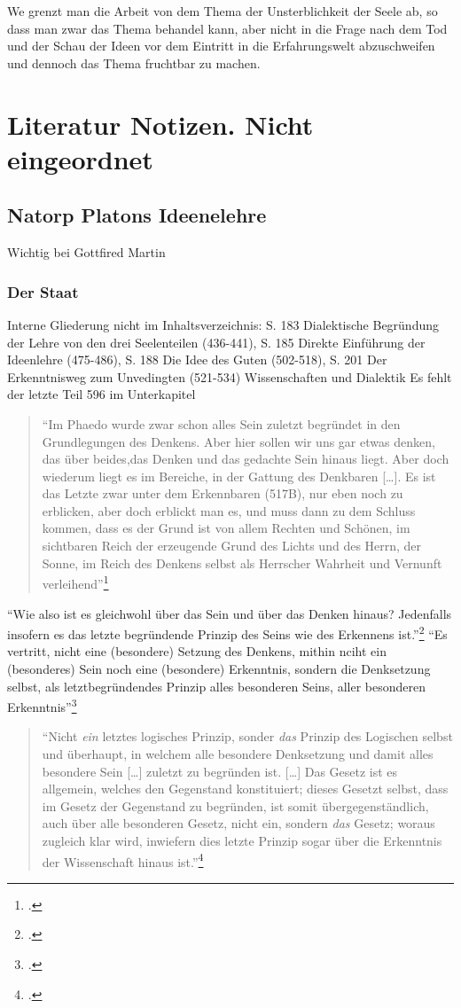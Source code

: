 \documentclass[12pt]{article}
\newcommand*{\zitatblock}[1]{%
    \begin{quote}
    \fontsize{10}{12}\selectfont
    \setlength{\parskip}{1.0em}
    #1
    \end{quote}
}
\begin{document}
We grenzt man die Arbeit von dem Thema der Unsterblichkeit der Seele ab, so dass man zwar das Thema behandel kann, aber nicht in die Frage nach dem Tod und der Schau der Ideen vor dem Eintritt in die Erfahrungswelt abzuschweifen und dennoch das Thema fruchtbar zu machen.

\section*{Literatur Notizen. Nicht eingeordnet}
\subsection*{Natorp Platons Ideenelehre}
Wichtig bei Gottfired Martin\nocite{NatorpIdeenlehre}
\subsubsection*{Der Staat}
Interne Gliederung nicht im Inhaltsverzeichnis: S. 183 Dialektische Begründung der Lehre von den drei Seelenteilen (436-441), S. 185 Direkte Einführung der Ideenlehre (475-486), S. 188 Die Idee des Guten (502-518), S. 201 Der Erkenntnisweg zum Unvedingten (521-534) Wissenschaften und Dialektik
Es fehlt der letzte Teil 596 im Unterkapitel
\zitatblock{\enquote{Im Phaedo wurde zwar schon alles Sein zuletzt begründet in den Grundlegungen des Denkens. Aber hier sollen wir uns gar etwas denken, das über beides,das Denken und das gedachte Sein hinaus liegt. Aber doch wiederum liegt es im Bereiche, in der Gattung des Denkbaren [\dots]. Es ist das Letzte zwar unter dem Erkennbaren (517B), nur eben noch zu erblicken, aber doch erblickt man es, und muss dann zu dem Schluss kommen, dass es der Grund ist von allem Rechten und Schönen, im sichtbaren Reich der erzeugende Grund des Lichts und des Herrn, der Sonne, im Reich des Denkens selbst als Herrscher Wahrheit und Vernunft verleihend}\footcite[][S. 191]{NatorpIdeenlehre}}
\enquote{Wie also ist es gleichwohl über das Sein und über das Denken hinaus? Jedenfalls insofern es das letzte begründende Prinzip des Seins wie des Erkennens ist.}\footcite[][S. 191]{NatorpIdeenlehre}
\enquote{Es vertritt, nicht eine (besondere) Setzung des Denkens, mithin nciht ein (besonderes) Sein noch eine (besondere) Erkenntnis, sondern die Denksetzung selbst, als letztbegründendes Prinzip alles besonderen Seins, aller besonderen Erkenntnis}\footcite[][S. 192]{NatorpIdeenlehre}
\zitatblock{\enquote{Nicht \emph{ein} letztes logisches Prinzip, sonder \emph{das} Prinzip des Logischen selbst und überhaupt, in welchem alle besondere Denksetzung und damit alles besondere Sein [\dots] zuletzt zu begründen ist. [\dots] Das Gesetz ist es allgemein, welches den Gegenstand konstituiert; dieses Gesetzt selbst, dass im Gesetz der Gegenstand zu begründen, ist somit übergegenständlich, auch über alle besonderen Gesetz, nicht ein, sondern \emph{das} Gesetz; woraus zugleich klar wird, inwiefern dies letzte Prinzip sogar über die Erkenntnis der Wissenschaft hinaus ist.}\footcite[vgl.][S. 194f.]{NatorpIdeenlehre}}
\end{document}
